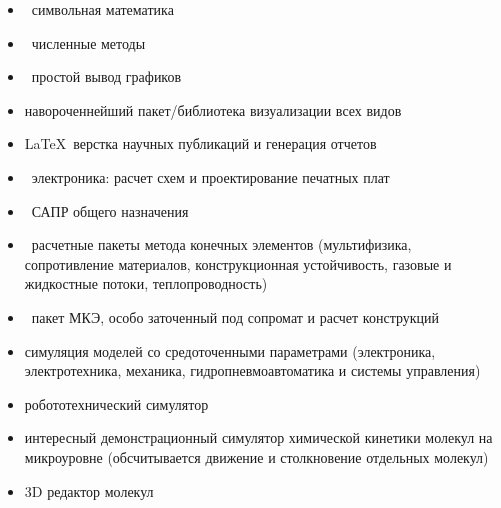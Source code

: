 
\begin{itemize}[nosep]
  \item \maxima\ символьная математика
  \item \octave\ численные методы
  \item \gnuplot\ простой вывод графиков
  \item {} навороченнейший пакет/библиотека визуализации всех
  видов
  \item \LaTeX\ верстка научных публикаций и генерация отчетов
  \item {}\ электроника: расчет схем и проектирование
  печатных плат
  \item {}\ САПР общего назначения
  \item {}\ расчетные пакеты метода конечных элементов
  (мультифизика, сопротивление материалов, конструкционная устойчивость,
  газовые и жидкостные потоки, теплопроводность)
  \item {}\ пакет МКЭ, особо заточенный под сопромат и
  расчет конструкций
  \item {} симуляция моделей со средоточенными
  параметрами
  (электроника, электротехника, механика, гидропневмоавтоматика и системы
  управления)
  \item {} робототехнический симулятор
  \item {}\note{\win} интересный демонстрационный симулятор
  химической кинетики молекул на микроуровне (обсчитывается движение и
  столкновение отдельных молекул)
  \item {} 3D редактор молекул
\end{itemize}


